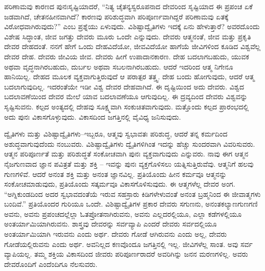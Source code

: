 ಪರಿಣಾಮವು ಕಾರಣದ ಪುನಃಸೃಷ್ಟಿಯಾದರೆ, “ನಿತ್ಯ ಚೈತನ್ಯಸ್ವರೂಪನಾದ ದೇವರಿಂದ ಸೃಷ್ಟಿಯಾದ ಈ ಪ್ರಪಂಚ ಏಕೆ ಜಡವಾಗಿದೆ, ಚೇತನಹೀನವಾಗಿದೆ? ಕಾರಣವು ಪರಿಶುದ್ಧವಾಗಿ ಪರಿಪೂರ್ಣವಾಗಿದ್ದರೆ ಪರಿಣಾಮವು ಏತಕ್ಕೆ ವಿರೋಧವಾಗಿರುವುದು?” ಎಂಬ ಪ್ರಶ್ನೆಯು ಏಳುವುದು. ವಿಶಿಷ್ಟಾದ್ವೈತಿಗಳು ಇದಕ್ಕೆ ಏನು ಹೇಳುತ್ತಾರೆ? ಅವರದೊಂದು ವಿಶೇಷ ಸಿದ್ಧಾಂತ, ಜೀವ ಜಗತ್ತು ದೇವರು ಮೂರು ಒಂದೇ ಎನ್ನುವುದು. ದೇವರು ಆತ್ಮನಂತೆ, ಜೀವ ಮತ್ತು ಪ್ರಕೃತಿ ದೇವರ ದೇಹದಂತೆ. ನನಗೆ ಹೇಗೆ ಒಂದು ದೇಹವಿದೆಯೋ, ಜೀವವಿದೆಯೋ ಹಾಗೆಯೆ ಜೀವಿಗಳಿಂದ ಕೂಡಿದ ವಿಶ್ವವೆಲ್ಲ ದೇವರ ದೇಹ. ದೇವರು ಜೀವಿಯ ಜೀವ. ದೇವರು ಹೀಗೆ ಉಪಾದಾನಕಾರಣ. ದೇಹ ಬದಲಾಗಬಹುದು, ಯುವಕ ಅಥವಾ ವೃದ್ಧನಾಗಿರಬಹುದು, ದುರ್ಬಲ ಅಥವಾ ಸಬಲನಾಗಿರಬಹುದು. ಆದರೆ ಇದರಿಂದ ಆತ್ಮ ನಿಗೇನೂ ಹಾನಿಯಿಲ್ಲ. ದೇಹದ ಮೂಲಕ ವ್ಯಕ್ತವಾಗುತ್ತಿರುವುದೆ ಆ ಪರಾತ್ಪರ ತತ್ತ್ವ. ದೇಹ ಬಂದು ಹೋಗುವುದು, ಆದರೆ ಆತ್ಮ ಬದಲಾಗುವುದಿಲ್ಲ. ಇದರಂತೆಯೇ ಇಡೀ ವಿಶ್ವ ದೇವರ ದೇಹವಾಗಿದೆ. ಈ ದೃಷ್ಟಿಯಿಂದ ಅದು ದೇವರು. ವಿಶ್ವದ ಬದಲಾವಣೆಯಿಂದ ದೇವರ ಮೇಲೆ ಯಾವ ಬದಲಾವಣೆಯೂ ಆಗುವುದಿಲ್ಲ. ಈ ದ್ರವ್ಯದಿಂದ ದೇವರು ವಿಶ್ವವನ್ನು ಸೃಷ್ಟಿಸುವನು. ಕಲ್ಪದ ಅಂತ್ಯದಲ್ಲಿ ದೇಹವು ಸೂಕ್ಷ್ಮವಾಗಿ ಸಂಕುಚಿತವಾಗುವುದು. ಮತ್ತೊಂದು ಕಲ್ಪದ ಪ್ರಾರಂಭದಲ್ಲಿ ಅದು ಪುನಃ ವಿಕಾಸಗೊಳ್ಳುವುದು. ವಿಕಾಸದಿಂದ ಜಗತ್ತಿನಲ್ಲಿ ವೈವಿಧ್ಯ ಜನಿಸುವುದು.

ದ್ವೈತಿಗಳು ಮತ್ತು ವಿಶಿಷ್ಟಾದ್ವೈತಿಗಳು–ಇಬ್ಬರೂ, ಆತ್ಮವು ಸ್ವಭಾವತಃ ಪರಿಶುದ್ಧ, ಆದರೆ ತನ್ನ ಕರ್ಮದಿಂದ ಅಶುದ್ಧವಾಗುವುದೆಂದು ನಂಬುವರು. ವಿಶಿಷ್ಟಾದ್ವೈತಿಗಳು ದ್ವೈತಿಗಳಿಗಿಂತ ಇದನ್ನು ಹೆಚ್ಚು ಸುಂದರವಾಗಿ ವಿವರಿಸುವರು. ಆತ್ಮನ ಪರಿಪೂರ್ಣತೆ ಮತ್ತು ಪರಿಶುದ್ಧತೆ ಸಂಕೋಚವಾಗಿ ಪುನಃ ವ್ಯಕ್ತವಾಗುವುದು ಎನ್ನುವರು. ನಾವು ಈಗ ಆತ್ಮನ ನೈಜಗುಣವಾದ ಜ್ಞಾನ ಪವಿತ್ರತೆ ಮತ್ತು ಶಕ್ತಿ – ಇವನ್ನು ಪುನಃ ವ್ಯಕ್ತಗೊಳಿಸಲು ಯತ್ನಿಸುತ್ತಿರುವೆವು. ಆತ್ಮನಿಗೆ ಹಲವು ಗುಣಗಳಿವೆ. ಆದರೆ ಅನಂತ ಶಕ್ತಿ ಮತ್ತು ಅನಂತ ಜ್ಞಾನವಿಲ್ಲ. ಪ್ರತಿಯೊಂದು ಹೀನ ಕರ್ಮವೂ ಆತ್ಮನನ್ನು ಸಂಕೋಚಮಾಡುವುದು, ಪ್ರತಿಯೊಂದು ಸತ್ಕರ್ಮವೂ ವಿಕಾಸಗೊಳಿಸುವುದು. ಈ ಆತ್ಮಗಳೆಲ್ಲ ದೇವರ ಅಂಗ. “ಅಗ್ನಿಕುಂಡದಿಂದ ಅದರ ಸ್ವಭಾವದಂತೆಯೆ ಇರುವ ಸಹಸ್ರಾರು ಕಿಡಿಗಳೇಳುವಂತೆ ಅನಂತ ಬ್ರಹ್ಮನಿಂದ ಈ ಜೀವಾತ್ಮಗಳು ಬಂದಿವೆ.” ಪ್ರತಿಯೊಂದರ ಗುರಿಯೂ ಒಂದೇ. ವಿಶಿಷ್ಟಾದ್ವೈತಿಗಳ ಪ್ರಕಾರ ದೇವರು ಸಗುಣನು, ಅನಂತಕಲ್ಯಾಣಗುಣಗಣಿ ಅವನು, ಅವನು ಪ್ರಪಂಚದಲ್ಲೆಲ್ಲಾ ಓತಪ್ರೋತನಾಗಿರುವನು, ಅವನು ಎಲ್ಲದರಲ್ಲಿಯೂ, ಎಲ್ಲಾ ಕಡೆಗಳಲ್ಲಿಯೂ ಅಂತರ್ಯಾಮಿಯಾಗಿರುವನು. ಶಾಸ್ತ್ರವು ದೇವರನ್ನು ಸರ್ವವ್ಯಾಪಿ ಎಂದರೆ ದೇವರು ಸರ್ವದಲ್ಲಿಯೂ ಅಂತರ್ಯಾಮಿಯಾಗಿ ಇರುವನು ಎಂದು ಅರ್ಥ. ದೇವರು ಗೋಡೆ ಆಗಿರುವನು ಎಂದು ಅಲ್ಲ, ದೇವರು ಗೋಡೆಯಲ್ಲಿರುವನು ಎಂದು ಅರ್ಥ. ಅವನಿಲ್ಲದ ಕಣವೊಂದೂ ಜಗತ್ತಿನಲ್ಲಿ ಇಲ್ಲ. ಜೀವಿಗಳೆಲ್ಲ ಸಾಂತ. ಅವು ಸರ್ವ ವ್ಯಾಪಿಯಲ್ಲ. ತಮ್ಮ ಶಕ್ತಿಯ ವಿಕಾಸದಿಂದ ಜೀವರು ಪರಿಪೂರ್ಣರಾದರೆ ಅವರಿಗಿನ್ನು ಜನನ ಮರಣಗಳಿಲ್ಲ. ಅವರು ದೇವರೊಂದಿಗೆ ಎಂದೆಂದಿಗೂ ನೆಲಸುವರು.


